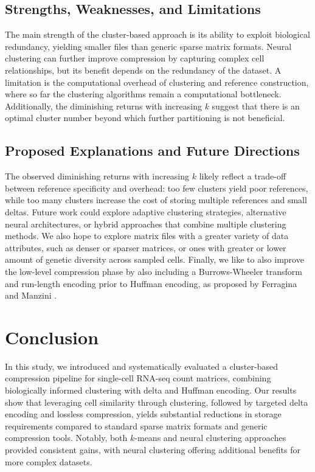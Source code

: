 \documentclass[unnumsec,webpdf,contemporary,large]{oup-authoring-template}
\begin{document}
\subsection{Strengths, Weaknesses, and Limitations}
The main strength of the cluster-based approach is its ability to exploit biological redundancy, yielding smaller files than generic sparse matrix formats. Neural clustering can further improve compression by capturing complex cell relationships, but its benefit depends on the redundancy of the dataset. A limitation is the computational overhead of clustering and reference construction, where so far the clustering algorithms remain a computational bottleneck. Additionally, the diminishing returns with increasing $k$ suggest that there is an optimal cluster number beyond which further partitioning is not beneficial. 

\subsection{Proposed Explanations and Future Directions}
The observed diminishing returns with increasing $k$ likely reflect a trade-off between reference specificity and overhead: too few clusters yield poor references, while too many clusters increase the cost of storing multiple references and small deltas. Future work could explore adaptive clustering strategies, alternative neural architectures, or hybrid approaches that combine multiple clustering methods. We also hope to explore matrix files with a greater variety of data attributes, such as denser or sparser matrices, or ones with greater or lower amount of genetic diversity across sampled cells. Finally, we like to also improve the low-level compression phase by also including a Burrows-Wheeler transform and run-length encoding prior to Huffman encoding, as proposed by Ferragina and Manzini \cite{fm-index}.

\section{Conclusion}

In this study, we introduced and systematically evaluated a cluster-based compression pipeline for single-cell RNA-seq count matrices, combining biologically informed clustering with delta and Huffman encoding. Our results show that leveraging cell similarity through clustering, followed by targeted delta encoding and lossless compression, yields substantial reductions in storage requirements compared to standard sparse matrix formats and generic compression tools. Notably, both $k$-means and neural clustering approaches provided consistent gains, with neural clustering offering additional benefits for more complex datasets.
\end{document}
